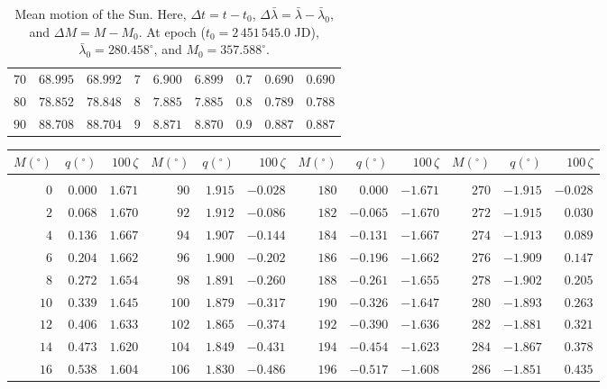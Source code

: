 \begin{table}[!h]
\begin{tabular}{rrr|rrr|rrr}
$70$ &  $68.995$ &  $68.992$ & $7$ &   $6.900$ &   $6.899$ & $0.7$ &   $0.690$ &   $0.690$\\
$80$ &  $78.852$ &  $78.848$ & $8$ &   $7.885$ &   $7.885$ & $0.8$ &   $0.789$ &   $0.788$\\
$90$ &  $88.708$ &  $88.704$ & $9$ &   $8.871$ &   $8.870$ & $0.9$ &   $0.887$ &   $0.887$\\
\end{tabular}
\caption{Mean motion of the Sun.  Here, $\Delta t = t-t_0$, $\Delta\bar{\lambda} = \bar{\lambda}-\bar{\lambda}_0$, and $\Delta M = M - M_0$. 
At epoch  ($t_0 = 2\,451\,545.0$ JD), $\bar{\lambda}_0 = 280.458^\circ$, and $M_0 = 357.588^\circ$.}\label{lt5}
\end{table}

\clearpage
\begin{table}[!h]
\vspace{0.25cm}
\centering
\scriptsize{ \begin{tabular}{rrr|rrr|rrr|rrr}
$M(^\circ)$ & $q(^\circ)$  & $100\,\zeta$ & $M(^\circ)$ & $q(^\circ)$  & $100\,\zeta$ & $M(^\circ)$ & $q(^\circ)$  & $100\,\zeta$& $M(^\circ)$ & $q(^\circ)$  & $100\,\zeta$\\\hline
&&&&&&&&&&&\\[-1.75ex]
  $0$ &  $0.000$ &  $1.671$ &  $90$ &  $1.915$ & $-0.028$ & $180$ &  $0.000$ & $-1.671$ & $270$ & $-1.915$ & $-0.028$\\
  $2$ &  $0.068$ &  $1.670$ &  $92$ &  $1.912$ & $-0.086$ & $182$ & $-0.065$ & $-1.670$ & $272$ & $-1.915$ & $0.030$\\
  $4$ &  $0.136$ &  $1.667$ &  $94$ &  $1.907$ & $-0.144$ & $184$ & $-0.131$ & $-1.667$ & $274$ & $-1.913$ &  $0.089$\\
  $6$ &  $0.204$ &  $1.662$ &  $96$ &  $1.900$ & $-0.202$ & $186$ & $-0.196$ & $-1.662$ & $276$ & $-1.909$ &  $0.147$\\
  $8$ &  $0.272$ &  $1.654$ &  $98$ &  $1.891$ & $-0.260$ & $188$ & $-0.261$ & $-1.655$ & $278$ & $-1.902$ &  $0.205$\\
 $10$ & $0.339$ &  $1.645$ & $100$ &  $1.879$ & $-0.317$ & $190$ & $-0.326$ & $-1.647$ & $280$ & $-1.893$ &  $0.263$\\
 $12$ &  $0.406$ &  $1.633$ & $102$ &  $1.865$ & $-0.374$ & $192$ & $-0.390$ & $-1.636$ & $282$ & $-1.881$ &  $0.321$\\
 $14$ &  $0.473$ &  $1.620$ & $104$ &  $1.849$ & $-0.431$ & $194$ & $-0.454$ & $-1.623$ & $284$ & $-1.867$ &  $0.378$\\
 $16$ &  $0.538$ &  $1.604$ & $106$ &  $1.830$ & $-0.486$ & $196$ & $-0.517$ & $-1.608$ & $286$ & $-1.851$ &  $0.435$\\

\end{tabular}}
\end{table}
